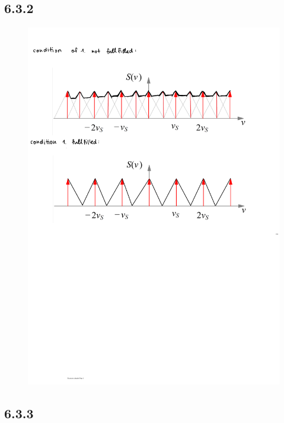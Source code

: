 \documentclass[a4paper]{article}
\begin{document}
\newpage
\subsection*{6.3.2}
\begin{figure}[!ht]
	\centering
	\includegraphics[width=0.79\linewidth]{6_3_2.pdf}
	\label{fig:delaunay}
\end{figure}

\subsection*{6.3.3}
\end{document}
